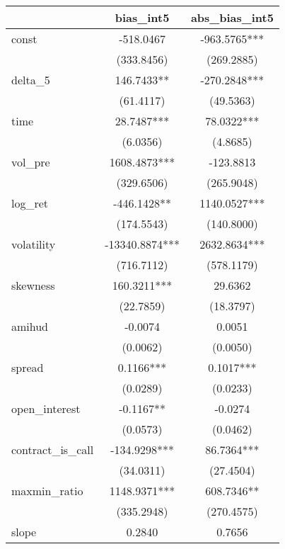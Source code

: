\begin{tabular}{lcc}
\hline
                   &   bias\_int5   & abs\_bias\_int5  \\
\midrule
\midrule
const              & -518.0467      & -963.5765***     \\
                   & (333.8456)     & (269.2885)       \\
delta\_5           & 146.7433**     & -270.2848***     \\
                   & (61.4117)      & (49.5363)        \\
time               & 28.7487***     & 78.0322***       \\
                   & (6.0356)       & (4.8685)         \\
vol\_pre           & 1608.4873***   & -123.8813        \\
                   & (329.6506)     & (265.9048)       \\
log\_ret           & -446.1428**    & 1140.0527***     \\
                   & (174.5543)     & (140.8000)       \\
volatility         & -13340.8874*** & 2632.8634***     \\
                   & (716.7112)     & (578.1179)       \\
skewness           & 160.3211***    & 29.6362          \\
                   & (22.7859)      & (18.3797)        \\
amihud             & -0.0074        & 0.0051           \\
                   & (0.0062)       & (0.0050)         \\
spread             & 0.1166***      & 0.1017***        \\
                   & (0.0289)       & (0.0233)         \\
open\_interest     & -0.1167**      & -0.0274          \\
                   & (0.0573)       & (0.0462)         \\
contract\_is\_call & -134.9298***   & 86.7364***       \\
                   & (34.0311)      & (27.4504)        \\
maxmin\_ratio      & 1148.9371***   & 608.7346**       \\
                   & (335.2948)     & (270.4575)       \\
slope              & 0.2840         & 0.7656           \\

\end{tabular}
